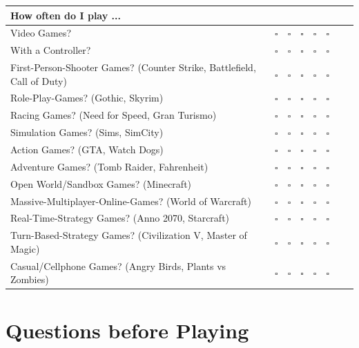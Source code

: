 \documentclass[11pt,a4paper,titlepage,table]{article}
\begin{document}
\begin{table}[H]
\begin{tabularx}{1.1\textwidth}{|X|U|U|U|U|U|U|X|}
	\hline
  		How often do I play ... &  &  &  &  &  \\
  	\hline Video Games? & $\square$ & $\square$ & $\square$ & $\square$ & $\square$ \\
  	\hline With a Controller? & $\square$ & $\square$ & $\square$ & $\square$ & $\square$\\
  	\hline First-Person-Shooter Games? (Counter Strike, Battlefield, Call of Duty) & $\square$ & $\square$ & $\square$ & $\square$ & $\square$ \\
  	\hline Role-Play-Games? (Gothic, Skyrim) & $\square$ & $\square$ & $\square$ & $\square$ & $\square$ \\
  	\hline Racing Games? (Need for Speed, Gran Turismo) & $\square$ & $\square$ & $\square$ & $\square$ & $\square$ \\
  	\hline Simulation Games? (Sims, SimCity)& $\square$ & $\square$ & $\square$ & $\square$ & $\square$ \\
  	\hline Action Games? (GTA, Watch Dogs)& $\square$ & $\square$ & $\square$ & $\square$ & $\square$ \\
  	\hline Adventure Games? (Tomb Raider, Fahrenheit)& $\square$ & $\square$ & $\square$ & $\square$ & $\square$ \\
  	\hline Open World/Sandbox Games? (Minecraft) & $\square$ & $\square$ & $\square$ & $\square$ & $\square$ \\
  	\hline Massive-Multiplayer-Online-Games? (World of Warcraft)& $\square$ & $\square$ & $\square$ & $\square$ & $\square$ \\
  	\hline Real-Time-Strategy Games? (Anno 2070, Starcraft)& $\square$ & $\square$ & $\square$ & $\square$ & $\square$ \\
  	\hline Turn-Based-Strategy Games? (Civilization V, Master of Magic)& $\square$ & $\square$ & $\square$ & $\square$ & $\square$ \\
  	\hline Casual/Cellphone Games? (Angry Birds, Plants vs Zombies)& $\square$ & $\square$ & $\square$ & $\square$ & $\square$ \\
	\hline
\end{tabularx}
\end{table}

\section{Questions before Playing}
\end{document}
